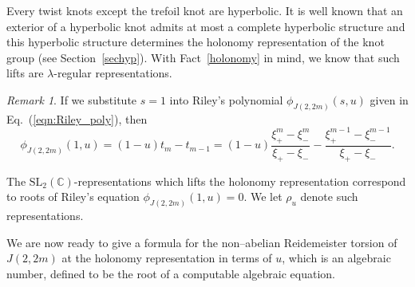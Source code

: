 \documentclass[a4paper]{amsart}
\theoremstyle{plain}
\theoremstyle{definition}
\theoremstyle{remark}
\newtheorem{remark}{Remark}%
\newcommand{\C}{{\mathbb C}}
\newcommand{\cusp}{{\mathfrak{c}}}
\newcommand{\SL}{{\mathrm{SL}_2(\C)}}
\begin{document}
Every twist knots except the trefoil knot are hyperbolic. 
It is well known that 
an exterior of a hyperbolic knot admits at most a complete hyperbolic structure and 
this hyperbolic structure determines the holonomy representation of the knot group (see Section~\ref{sechyp}). With Fact~\ref{holonomy} in mind, we know that such lifts are $\lambda$-regular representations.


%
\begin{remark}
If we substitute $s=1$ into Riley's polynomial $\phi_{J(2, 2m)} (s, u)$ given in Eq.~(\ref{eqn:Riley_poly}), then
\[
\phi_{J(2, 2m)} (1, u)= (1-u) t_m - t_{m-1} = 
(1-u) \frac{\xi_{+}^m - \xi_{-}^m}{\xi_{+} - \xi_{-}} - \frac{\xi_{+}^{m-1}-\xi_{-}^{m-1}}{\xi_{+} - \xi_{-}}.
\] 
\end{remark}
%

%
The $\SL$-representations which lifts the holonomy representation correspond 
to roots of Riley's equation $\phi_{J(2, 2m)}(1,u)=0$. We let $\rho_u$ denote such representations.

We are now ready to give a formula for the non--abelian Reidemeister torsion of $J(2,2m)$ at the holonomy representation in terms of $u$, which is an algebraic number, defined to be the root of  a computable algebraic equation. 
\end{document}
